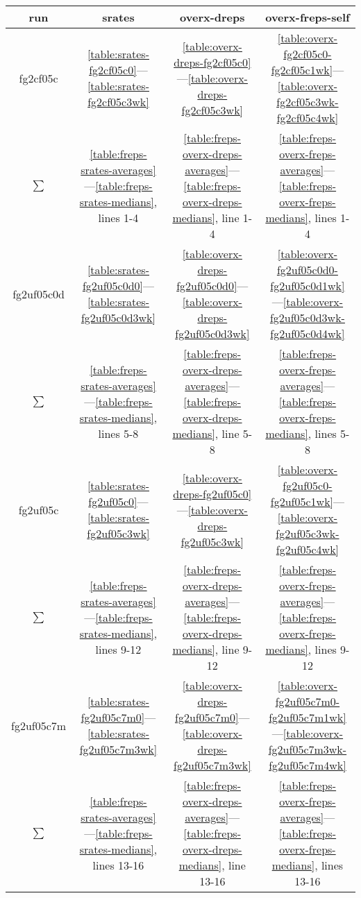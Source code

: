 \begin{table}
\begin{tabular}{|cccc|}
\toprule
run & srates & overx-dreps & overx-freps-self  \\
\midrule
fg2cf05c & \ref{table:srates-fg2cf05c0}—\ref{table:srates-fg2cf05c3wk} & \ref{table:overx-dreps-fg2cf05c0}—\ref{table:overx-dreps-fg2cf05c3wk} & \ref{table:overx-fg2cf05c0-fg2cf05c1wk}—\ref{table:overx-fg2cf05c3wk-fg2cf05c4wk} \\
$\sum$ & \ref{table:freps-srates-averages}—\ref{table:freps-srates-medians}, lines 1-4 & \ref{table:freps-overx-dreps-averages}—\ref{table:freps-overx-dreps-medians}, line 1-4 & \ref{table:freps-overx-freps-averages}—\ref{table:freps-overx-freps-medians}, lines 1-4  \\
\hline
fg2uf05c0d & \ref{table:srates-fg2uf05c0d0}—\ref{table:srates-fg2uf05c0d3wk} & \ref{table:overx-dreps-fg2uf05c0d0}—\ref{table:overx-dreps-fg2uf05c0d3wk} & \ref{table:overx-fg2uf05c0d0-fg2uf05c0d1wk}—\ref{table:overx-fg2uf05c0d3wk-fg2uf05c0d4wk} \\
$\sum$ & \ref{table:freps-srates-averages}—\ref{table:freps-srates-medians}, lines 5-8 & \ref{table:freps-overx-dreps-averages}—\ref{table:freps-overx-dreps-medians}, line 5-8 & \ref{table:freps-overx-freps-averages}—\ref{table:freps-overx-freps-medians}, lines 5-8  \\
\hline
fg2uf05c & \ref{table:srates-fg2uf05c0}—\ref{table:srates-fg2uf05c3wk} & \ref{table:overx-dreps-fg2uf05c0}—\ref{table:overx-dreps-fg2uf05c3wk} & \ref{table:overx-fg2uf05c0-fg2uf05c1wk}—\ref{table:overx-fg2uf05c3wk-fg2uf05c4wk} \\
$\sum$ & \ref{table:freps-srates-averages}—\ref{table:freps-srates-medians}, lines 9-12 & \ref{table:freps-overx-dreps-averages}—\ref{table:freps-overx-dreps-medians}, line 9-12 & \ref{table:freps-overx-freps-averages}—\ref{table:freps-overx-freps-medians}, lines 9-12  \\
\hline
fg2uf05c7m & \ref{table:srates-fg2uf05c7m0}—\ref{table:srates-fg2uf05c7m3wk} & \ref{table:overx-dreps-fg2uf05c7m0}—\ref{table:overx-dreps-fg2uf05c7m3wk} & \ref{table:overx-fg2uf05c7m0-fg2uf05c7m1wk}—\ref{table:overx-fg2uf05c7m3wk-fg2uf05c7m4wk} \\
$\sum$ & \ref{table:freps-srates-averages}—\ref{table:freps-srates-medians}, lines 13-16 & \ref{table:freps-overx-dreps-averages}—\ref{table:freps-overx-dreps-medians}, line 13-16 & \ref{table:freps-overx-freps-averages}—\ref{table:freps-overx-freps-medians}, lines 13-16  \\

\end{tabular}
\end{table}
